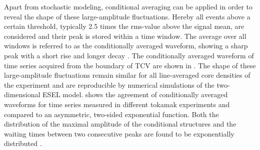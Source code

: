 Apart from stochastic modeling, conditional averaging can be applied in order to reveal the shape of these large-amplitude fluctuations. Hereby all events above a certain threshold, typically 2.5 times the rms-value above the signal mean, are considered and their peak is stored within a time window. The average over all windows is referred to as the conditionally averaged waveform, showing a sharp peak with a short rise and longer decay \cite{antar2003universality,boedo2005edge,garcia2007fluctuations,garcia2007collisionality,garcia2013intermittent,garcia2015intermittent,garcia2017sol,kube2018intermittent,garcia2018intermittent}. The conditionally averaged waveform of time series acquired from the boundary of TCV are shown in . The shape of these large-amplitude fluctuations remain similar for all line-averaged core densities of the experiment and are reproducible by numerical simulations of the two-dimensional ESEL model.  shows the agreement of conditionally averaged waveforms for time series measured in different tokamak experiments and compared to an asymmetric, two-sided exponential function. Both the distribution of the maximal amplitude of the conditional structures and the waiting times between two consecutive peaks are found to be exponentially distributed \cite{antar2005scaling,garcia2015intermittent,kube2018intermittent,garcia2017sol,garcia2018intermittent}.
